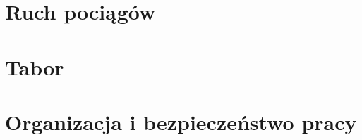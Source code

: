 \documentclass[10pt]{podrecznik}
\begin{document}
	
	\frontmatter
	\onecolumn

	
	
	
	\twocolumn
	\pagestyle{fancy-pagenum}
	\maintoc

	
	
	\mainmatter

	\part{Ruch pociągów}
	
	
	\part{Tabor}
	
	
	\part{Organizacja i bezpieczeństwo pracy}
	
	
	\backmatter
	\clearpage
	\nocite{*}
	
\end{document}
